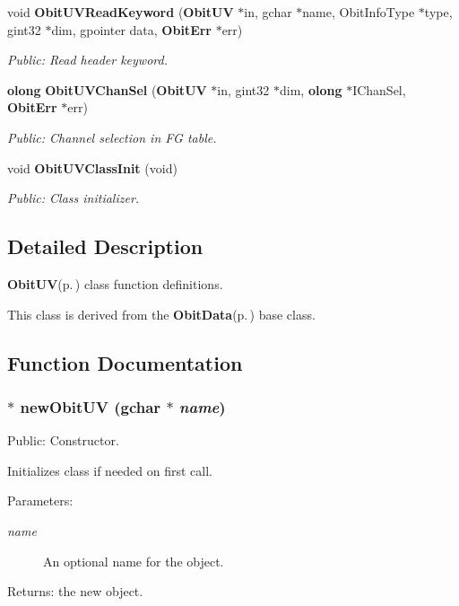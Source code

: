 \begin{CompactItemize}
void {\bf Obit\-UVRead\-Keyword} ({\bf Obit\-UV} $\ast$in, gchar $\ast$name, Obit\-Info\-Type $\ast$type, gint32 $\ast$dim, gpointer data, {\bf Obit\-Err} $\ast$err)
\begin{CompactList}\small\item\em Public: Read header keyword. \item\end{CompactList}\item 
{\bf olong} {\bf Obit\-UVChan\-Sel} ({\bf Obit\-UV} $\ast$in, gint32 $\ast$dim, {\bf olong} $\ast$IChan\-Sel, {\bf Obit\-Err} $\ast$err)
\begin{CompactList}\small\item\em Public: Channel selection in FG table. \item\end{CompactList}\item 
void {\bf Obit\-UVClass\-Init} (void)
\begin{CompactList}\small\item\em Public: Class initializer. \item\end{CompactList}\end{CompactItemize}


\subsection{Detailed Description}
{\bf Obit\-UV}{\rm (p.\,\pageref{structObitUV})} class function definitions. 

This class is derived from the {\bf Obit\-Data}{\rm (p.\,\pageref{structObitData})} base class.

\subsection{Function Documentation}
\subsubsection{$\ast$ new\-Obit\-UV (gchar $\ast$ {\em name})}\label{ObitUV_8c_a10}


Public: Constructor. 

Initializes class if needed on first call. \begin{Desc}
\item[Parameters:]
\begin{description}
\item[{\em name}]An optional name for the object. \end{description}
\end{Desc}
\begin{Desc}
\item[Returns:]the new object. \end{Desc}
